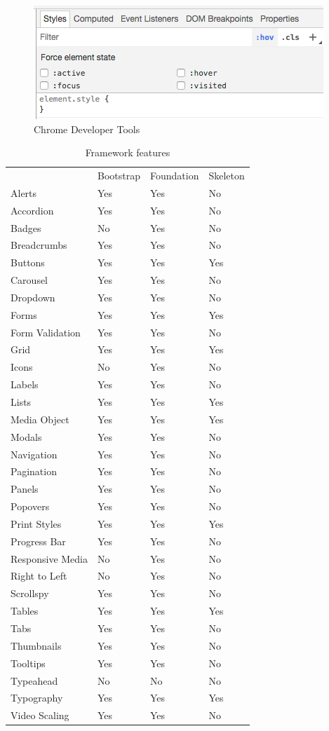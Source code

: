 \begin{figure}[ht]
\caption{Chrome Developer Tools}
  \label{fig:tools}
\includegraphics[scale=0.5]{../public/images/tools}
\centering
\end{figure}


\newpage
\begin{table}[!ht]
\centering
\caption{Framework features}
\label{features}
\begin{tabular}{llll}
 & Bootstrap & Foundation & Skeleton \\
Alerts & Yes & Yes & No \\
Accordion & Yes & Yes & No \\
Badges & No & Yes & No \\
Breadcrumbs & Yes & Yes & No \\
Buttons & Yes & Yes & Yes \\
Carousel & Yes & Yes & No \\
Dropdown & Yes & Yes & No \\
Forms & Yes & Yes & Yes \\
Form Validation & Yes & Yes & No \\
Grid & Yes & Yes & Yes \\
Icons & No & Yes & No \\
Labels & Yes & Yes & No \\
Lists & Yes & Yes & Yes \\
Media Object & Yes & Yes & Yes \\
Modals & Yes & Yes & No \\
Navigation & Yes & Yes & No \\
Pagination & Yes & Yes & No \\
Panels & Yes & Yes & No \\
Popovers & Yes & Yes & No \\
Print Styles & Yes & Yes & Yes \\
Progress Bar & Yes & Yes & No \\
Responsive Media & No & Yes & No \\
Right to Left & No & Yes & No \\
Scrollspy & Yes & Yes & No \\
Tables & Yes & Yes & Yes \\
Tabs & Yes & Yes & No \\
Thumbnails & Yes & Yes & No \\
Tooltips & Yes & Yes & No \\
Typeahead & No & No & No \\
Typography & Yes & Yes & Yes \\
Video Scaling & Yes & Yes & No
\end{tabular}
\end{table}

